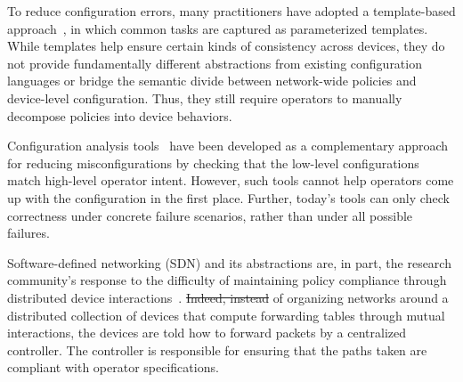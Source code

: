 \documentclass{sig-alternate-10pt}
\providecommand{\DIFadd}[1]{{\protect\color{blue}\uwave{#1}}} %
\providecommand{\DIFdel}[1]{{\protect\color{red}\sout{#1}}}                      %
\providecommand{\DIFaddbegin}{} %
\providecommand{\DIFaddend}{} %
\providecommand{\DIFdelbegin}{} %
\providecommand{\DIFdelend}{} %
\begin{document}
To reduce configuration errors, many practitioners have \DIFaddbegin \DIFadd{a }\DIFaddend adopted a template-based
approach~\cite{hatch,thwack}, in which common tasks are captured as parameterized templates.
%
%
While templates help ensure certain kinds of consistency across devices,
they do not provide fundamentally different abstractions from existing configuration languages
or bridge the semantic divide between network-wide policies and device-level configuration.
Thus, they still require operators to
manually decompose policies into device behaviors.

Configuration analysis tools~\cite{batfish,feamster+:rcc} have been developed as a complementary approach for reducing misconfigurations by checking that the low-level configurations match high-level operator intent. However, such tools cannot help operators come up with the configuration in the first place. Further, today's tools can only check correctness under concrete failure scenarios, rather than under all possible failures.

Software-defined networking (SDN) and its abstractions
are, in part, the research
community's response to the difficulty of maintaining policy
compliance through distributed device interactions~\cite{ethane}. 
\DIFdelbegin \DIFdel{Indeed, instead }\DIFdelend \DIFaddbegin \DIFadd{Instead }\DIFaddend of organizing networks around a distributed 
collection of devices that compute forwarding tables through
mutual interactions, the devices are told how to
forward packets by a centralized controller. The controller is responsible for ensuring that the
paths taken are compliant with operator specifications.
\end{document}
